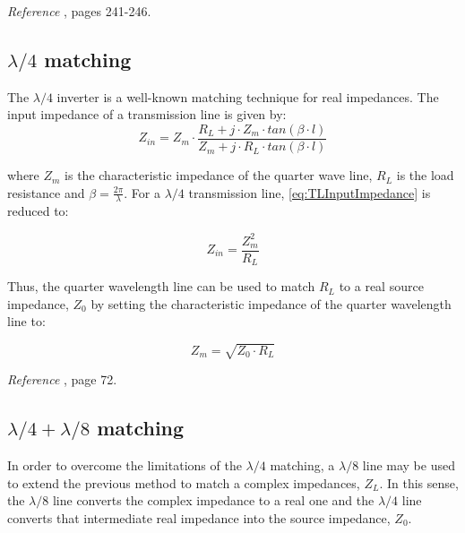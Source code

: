 \noindent \textit{Reference} \cite{Pozar}, pages 241-246.

\subsection{$\lambda/4$ matching}
The $\lambda/4$ inverter is a well-known matching technique for real impedances. The input impedance of a transmission line is given by:
\begin{equation}
Z_{in} = Z_m \cdot \frac{R_L + j \cdot Z_m \cdot tan(\beta \cdot l)}{Z_m + j \cdot R_L \cdot tan(\beta \cdot l)}
\label{eq:TLInputImpedance}
\end{equation}

\noindent where $Z_m$ is the characteristic impedance of the quarter wave line, $R_L$ is the load resistance and $\beta = \frac{2 \pi}{\lambda}$. For a $\lambda/4$ transmission line, \ref{eq:TLInputImpedance} is reduced to:

\begin{equation}
Z_{in} = \frac{Z_m^2}{R_L} 
\end{equation}


\noindent Thus, the quarter wavelength line can be used to match $R_L$ to a real source impedance, $Z_0$ by setting the characteristic impedance of the quarter wavelength line to:

\begin{equation}
Z_{m} = \sqrt{Z_0 \cdot R_L}
\end{equation}

\noindent \textit{Reference} \cite{Pozar}, page 72.

\subsection{$\lambda/4 + \lambda/8$ matching}
In order to overcome the limitations of the $\lambda/4$ matching, a $\lambda/8$ line may be used to extend the previous method to match a complex impedances, $Z_L$. In this sense, the $\lambda/8$ line converts the complex impedance to a real one and the $\lambda/4$ line converts that intermediate real impedance into the source impedance, $Z_0$.

